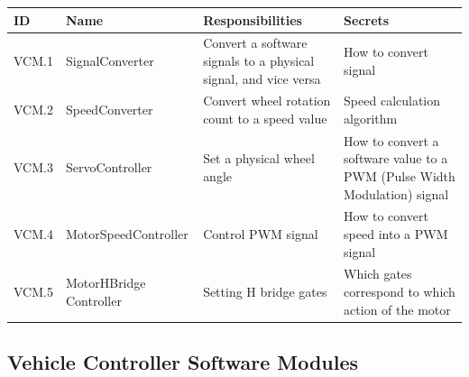 \documentclass [10pt]{article}
\begin{document}
\begin{longtable}{ |p{ }  | p{ } |  p{ } |  p{ } |}  \hline
    
    \textbf{ID} & \textbf{Name} &  \textbf{Responsibilities} & \textbf{Secrets} \\ \hline 
    
    
    \cellcolor{tableCell}VCM.1  & \cellcolor{tableCell}SignalConverter & \cellcolor{tableCell}Convert a software signals to a physical signal, and vice versa & \cellcolor{tableCell}How to convert signal  \\ \hline
    
    VCM.2 & SpeedConverter & Convert wheel rotation count to a speed value & Speed calculation algorithm \\ \hline
    
    \cellcolor{tableCell}VCM.3  & \cellcolor{tableCell}ServoController & \cellcolor{tableCell}Set a physical wheel angle & 
    \cellcolor{tableCell}How to convert a software value to a PWM (Pulse Width Modulation) signal \\ \hline
    
    VCM.4 & MotorSpeedController & Control PWM signal & How to convert speed into a PWM signal \\ \hline\hline
    
    \cellcolor{tableCell}VCM.5  & \cellcolor{tableCell}MotorHBridge \newline Controller & \cellcolor{tableCell}Setting H bridge gates & \cellcolor{tableCell}Which gates correspond to which action of the motor  \\ \hline
    
    
\end{longtable}


\subsection{Vehicle Controller Software Modules}
\end{document}
